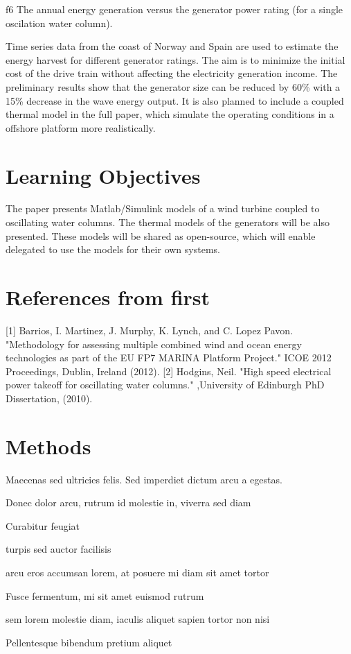 \documentclass[twoside]{article}
\begin{document}
\begin{multicols}{2}
{f6} The annual energy generation versus the generator power rating (for a single oscilation water column).

Time series data from the coast of Norway and Spain are used to estimate the energy harvest for different generator ratings. The aim is to minimize the initial cost of the drive train without affecting the electricity generation income. The preliminary results show that the generator size can be reduced by 60\% with a 15\% decrease in the wave energy output. It is also planned to include a coupled thermal model in the full paper, which simulate the operating conditions in a offshore platform more realistically.


\section{Learning Objectives} %
\label{sec:learning_objectives}

The paper presents Matlab/Simulink models of a wind turbine coupled to oscillating water columns. The thermal models of the generators will be also presented. These models will be shared as open-source, which will enable delegated to use the models for their own systems.


\section{References from first} %
\label{sec:references_from_first}
[1] Barrios, I. Martinez, J. Murphy, K. Lynch, and C. Lopez Pavon. "Methodology for assessing multiple combined wind and ocean energy technologies as part of the EU FP7 MARINA Platform Project." ICOE 2012 Proceedings, Dublin, Ireland (2012).
[2] Hodgins, Neil. "High speed electrical power takeoff for oscillating water columns." ,University of Edinburgh PhD Dissertation, (2010).


\section{Methods}

Maecenas sed ultricies felis. Sed imperdiet dictum arcu a egestas. 
\begin{compactitem}
\item Donec dolor arcu, rutrum id molestie in, viverra sed diam
\item Curabitur feugiat
\item turpis sed auctor facilisis
\item arcu eros accumsan lorem, at posuere mi diam sit amet tortor
\item Fusce fermentum, mi sit amet euismod rutrum
\item sem lorem molestie diam, iaculis aliquet sapien tortor non nisi
\item Pellentesque bibendum pretium aliquet
\end{compactitem}
\lipsum[4] %


\end{multicols}
\end{document}
